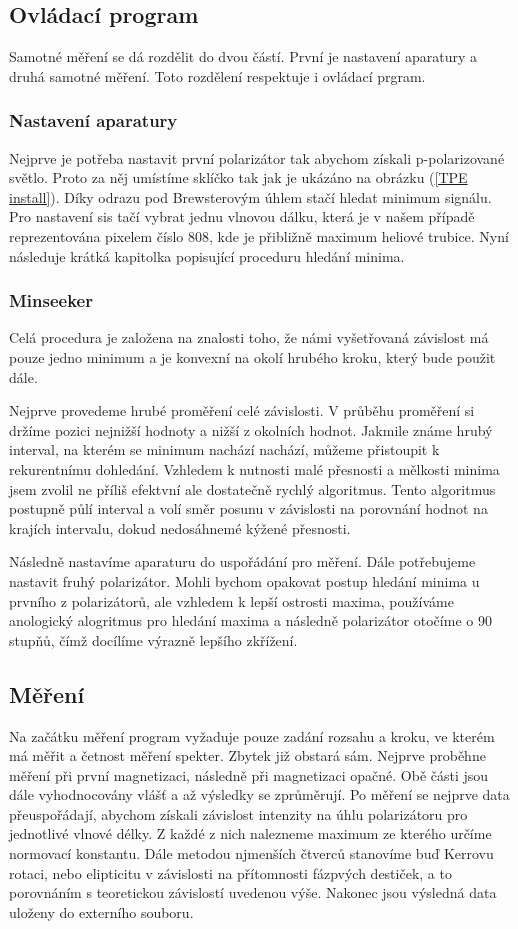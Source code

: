 \documentclass[a4paper,12pt]{article}
\begin{document}
\subsection{Ovládací program}
Samotné měření se dá rozdělit do dvou částí. První je nastavení aparatury a druhá samotné měření. Toto rozdělení respektuje i ovládací prgram.
\subsubsection{Nastavení aparatury}
Nejprve je potřeba nastavit první polarizátor tak abychom získali p-polarizované světlo. Proto za něj umístíme sklíčko tak jak je ukázáno na obrázku (\ref{TPE install}). Díky odrazu pod Brewsterovým úhlem stačí hledat minimum signálu. Pro nastavení sis tačí vybrat jednu vlnovou dálku, která je v našem případě reprezentována pixelem číslo 808, kde je přibližně maximum heliové trubice. Nyní následuje krátká kapitolka popisující proceduru hledání minima.

\subsubsection{Minseeker}
Celá procedura je založena na znalosti toho, že námi vyšetřovaná závislost má pouze jedno minimum a je konvexní na okolí hrubého kroku, který bude použit dále.

Nejprve provedeme hrubé proměření celé závislosti. V průběhu proměření si držíme pozici nejnižší hodnoty a nižší z okolních hodnot. Jakmile známe hrubý interval, na kterém se minimum nachází nachází, můžeme přistoupit k rekurentnímu dohledání. Vzhledem k nutnosti malé přesnosti a mělkosti minima jsem zvolil ne příliš efektvní ale dostatečně rychlý algoritmus. Tento algoritmus postupně půlí interval a volí směr posunu v závislosti na porovnání hodnot na krajích intervalu, dokud nedosáhnemé kýžené přesnosti.


Následně nastavíme aparaturu do uspořádání pro měření. Dále potřebujeme nastavit fruhý polarizátor. Mohli bychom opakovat postup hledání minima u prvního z polarizátorů, ale vzhledem k lepší ostrosti maxima, používáme anologický alogritmus pro hledání maxima a následně polarizátor otočíme o 90 stupňů, čímž docílíme výrazně lepšího zkřížení.

\subsection{Měření}
Na začátku měření program vyžaduje pouze zadání rozsahu a kroku, ve kterém má měřit a četnost měření spekter. Zbytek již obstará sám. Nejprve proběhne měření při první magnetizaci, následně při magnetizaci opačné. Obě části jsou dále vyhodnocovány vlášť a až výsledky se zprůměrují. Po měření se nejprve data přeuspořádají, abychom získali závislost intenzity na úhlu polarizátoru pro jednotlivé vlnové délky. Z každé z nich nalezneme maximum ze kterého určíme normovací konstantu. Dále metodou njmenších čtverců stanovíme buď Kerrovu rotaci, nebo elipticitu v závislosti na přítomnosti fázpvých destiček, a to porovnáním s teoretickou závislostí uvedenou výše. Nakonec jsou výsledná data uloženy do externího souboru.
\end{document}

